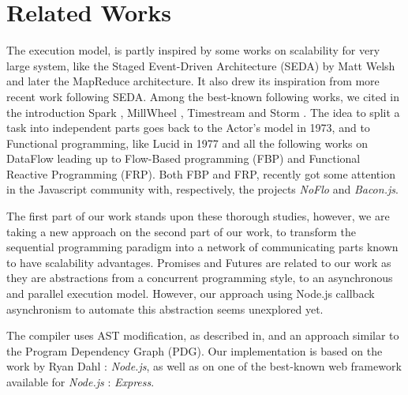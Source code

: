 \section{Related Works} \label{section:related}

The execution model, is partly inspired by some works on scalability for very large system, like the Staged Event-Driven Architecture (SEDA) by Matt Welsh\cite{Welsh2000} and later the MapReduce architecture\cite{Dean2008}.
It also drew its inspiration from more recent work following SEDA.
Among the best-known following works, we cited in the introduction Spark \cite{Zaharia2010}, MillWheel \cite{Akidau2013}, Timestream \cite{Qian2013} and Storm \cite{Marz2011}.
The idea to split a task into independent parts goes back to the Actor's model\cite{Hewitt1973} in 1973, and to Functional programming, like Lucid\cite{Ashcroft1977} in 1977 and all the following works on DataFlow leading up to Flow-Based programming (FBP)\cite{Morrison1994a} and Functional Reactive Programming (FRP)\cite{Elliott1997}.
Both FBP and FRP, recently got some attention in the Javascript community with, respectively, the projects \textit{NoFlo}\cite{NoFlo} and \textit{Bacon.js}\cite{Paananen2012}.

The first part of our work stands upon these thorough studies, however, we are taking a new approach on the second part of our work, to transform the sequential programming paradigm into a network of communicating parts known to have scalability advantages.
Promises\cite{Liskov1988} and Futures are related to our work as they are abstractions from a concurrent programming style, to an asynchronous and parallel execution model.
However, our approach using Node.js callback asynchronism to automate this abstraction seems unexplored yet.

The compiler uses AST modification, as described in\cite{Jones2003}, and an approach similar to the Program Dependency Graph (PDG)\cite{Ferrante1987}.
Our implementation is based on the work by Ryan Dahl : \textit{Node.js}\cite{Dahl}, as well as on one of the best-known web framework available for \textit{Node.js} : \textit{Express}\cite{express}.